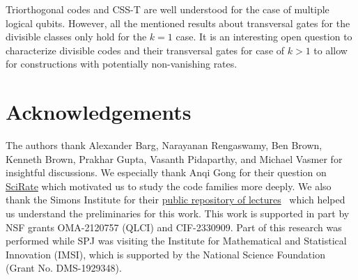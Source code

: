\documentclass[journal]{IEEEtran}
\begin{document}
Triorthogonal codes and CSS-T are well understood for the case of multiple logical qubits. However, all the mentioned results about transversal gates for the divisible classes only hold for the $k=1$ case. It is an interesting open question to characterize divisible codes and their transversal gates for case of $k>1$ to allow for constructions with potentially non-vanishing rates.

\section{Acknowledgements}
The authors thank Alexander Barg, Narayanan Rengaswamy,
Ben Brown,
Kenneth Brown,
Prakhar Gupta,
Vasanth Pidaparthy,
and Michael Vasmer
for insightful discussions. We especially thank Anqi Gong for their question on \href{https://scirate.com/}{SciRate} which motivated us to study the code families more deeply. We also thank the Simons Institute for their \href{https://simons.berkeley.edu/workshops/application-driven-coding-theory}{public repository of lectures}~\cite{simons_institute_for_the_theory_of_computing_application-driven_2024} which helped us understand the preliminaries for this work.
This work is supported in part by NSF grants OMA-2120757 (QLCI) and CIF-2330909. Part of this research was performed while SPJ was
visiting the Institute for Mathematical and Statistical
Innovation (IMSI), which is supported by the National
Science Foundation (Grant No. DMS-1929348).



\end{document}
